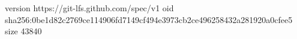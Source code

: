 version https://git-lfs.github.com/spec/v1
oid sha256:0be1d82c2769ce114906fd7149cf494e3973cb2ce496258432a281920a0cfee5
size 43840
